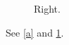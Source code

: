 \documentclass{article}
\begin{document}
\begin{figure}
\begin{minipage}{0.4\textwidth}\caption{Left.}\label{a}\end{minipage}\hfill
\begin{minipage}{0.4\textwidth}\caption{Right.}\label{b}\end{minipage}
\end{figure}
See \ref{a} and \ref{b}.
\end{document}
